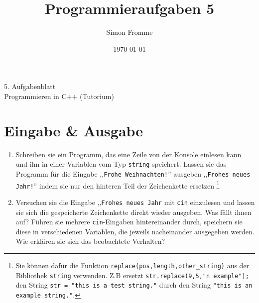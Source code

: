 \documentclass[paper=a4, fontsize=11pt, twoside]{scrartcl}
\title{Programmieraufgaben 5}
\author{Simon Fromme}
\date{\normalsize\today}
\begin{document}
\vspace*{0.75\baselineskip}
\begin{center}
  \Large 5. Aufgabenblatt \\\vspace{0.5em} \large Programmieren in C++ (Tutorium)
\end{center}


\section*{Eingabe \& Ausgabe}
\begin{enumerate}
	\item Schreiben sie ein Programm, das eine Zeile von der Konsole einlesen kann und ihn in einer Variablen vom Typ \texttt{string} speichert. 
		Lassen sie das Programm für die Eingabe ,,\texttt{Frohe Weihnachten!}'' ausgeben ,,\texttt{Frohes neues Jahr!}'' indem sie nur den hinteren Teil der Zeichenkette ersetzen
			\footnote{Sie können dafür die Funktion \texttt{replace(pos,length,other_string)} aus der Bibliothek \texttt{string} verwenden. Z.B ersetzt \texttt{str.replace(9,5,"n example");} den String \texttt{str = "this is a test string."} durch den String \texttt{"this is an example string."}.  }
		\item Versuchen sie die Eingabe ,,\texttt{Frohes neues Jahr} mit \texttt{cin} einzulesen und lassen sie sich die gespeicherte Zeichenkette direkt wieder ausgeben. Was fällt ihnen auf? Führen sie mehrere \texttt{cin}-Eingaben hintereinander durch, speichern sie diese in verschiedenen Variablen, die jeweils nacheinander ausgegeben werden. Wie erklären sie sich das beobachtete Verhalten?
\end{enumerate}
\end{document}
